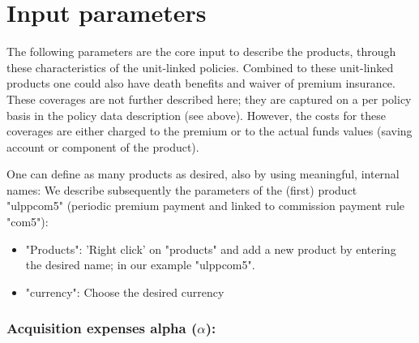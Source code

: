 \section{Input parameters}\label{sec:lifeproducts}

The following parameters are the core input to describe the products, through these characteristics of the unit-linked policies. Combined to these unit-linked products one could also have death benefits and waiver of premium insurance. These coverages are not further described here; they are captured on a per policy basis in the policy data description (see above). However, the costs for these coverages are either charged to the premium or to the actual funds values (saving account or component of the product).

One can define as many products as desired, also by using meaningful, internal names: We describe subsequently the parameters of the (first) product "ulppcom5" (periodic premium payment and linked to commission payment rule "com5"):

\begin{itemize}
	\item	"Products": 'Right click' on "products" and add a new product by entering the desired name; in our example "ulppcom5".
	\item	"currency": Choose the desired currency
\end{itemize}

\subsubsection{Acquisition expenses alpha ($\alpha$):}

